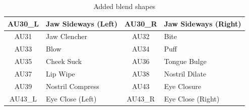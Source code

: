 \documentclass[../../main]{subfiles}
\begin{document}
\begin{table}[h]
\begin{tabular}{|c|l|c|l|}
        AU30\_L          & Jaw Sideways (Left)                     & AU30\_R           & Jaw Sideways (Right)                      \\ \hline
        AU31             & Jaw Clencher                            & AU32             & Bite                                      \\ \hline
        AU33             & Blow                                    & AU34             & Puff                                      \\ \hline
        AU35             & Cheek Suck                              & AU36             & Tongue Bulge                              \\ \hline
        AU37             & Lip Wipe                                & AU38             & Nostril Dilate                            \\ \hline
        AU39             & Nostril Compress                        & AU43             & Eye Closure                               \\ \hline
        AU43\_L          & Eye Close (Left)                        & AU43\_R           & Eye Close (Right)                         \\ \hline
    \end{tabular}
    \caption{Added blend shapes} 
    \label{tab:added_units} 
\end{table}
\end{document}
